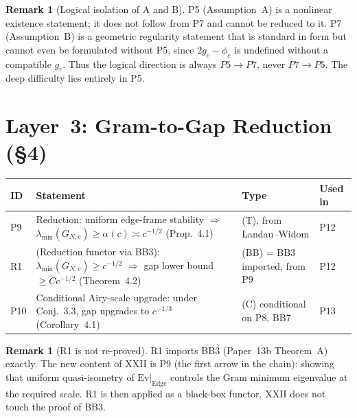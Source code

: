 \documentclass[12pt,a4paper]{amsart}
\theoremstyle{definition}
\newtheorem{remark}[theorem]{Remark}
\begin{document}
\begin{remark}[Logical isolation of A and B]
P5 (Assumption~A) is a nonlinear existence statement;
it does not follow from P7 and cannot be reduced to it.
P7 (Assumption~B) is a geometric regularity statement
that is standard in form but cannot even be formulated
without P5, since $2g_c - \phi_c$ is undefined without
a compatible $g_c$.
Thus the logical direction is always $P5 \to P7$, never
$P7 \to P5$.
The deep difficulty lies entirely in P5.
\end{remark}

\section{Layer~3: Gram-to-Gap Reduction (\S4)}
\label{sec:L3}

\begin{center}
\renewcommand{\arraystretch}{1.35}
\begin{tabular}{l p{5.5cm} l l}
\toprule
\textbf{ID} & \textbf{Statement} & \textbf{Type} & \textbf{Used in} \\
\midrule
P9 & Reduction: uniform edge-frame
    stability $\Rightarrow$
    $\lambda_{\min}(G_{N,c})\ge\alpha(c)
    \asymp c^{-1/2}$
    (Prop.~4.1)
    & (T), from Landau--Widom
    & P12 \\
R1 & (Reduction functor via BB3):
    $\lambda_{\min}(G_{N,c})\ge c^{-1/2}$
    $\Rightarrow$ gap lower bound
    $\ge Cc^{-1/2}$ (Theorem~4.2)
    & (BB) = BB3 imported, from P9
    & P12 \\
P10 & Conditional Airy-scale upgrade:
    under Conj.~3.3, gap upgrades
    to $c^{-1/3}$ (Corollary~4.1)
    & (C) conditional on P8, BB7
    & P13 \\
\bottomrule
\end{tabular}
\end{center}

\begin{remark}[R1 is not re-proved]
R1 imports BB3 (Paper~13b Theorem~A) exactly.
The new content of XXII is P9 (the first arrow in the chain):
showing that uniform quasi-isometry of $\mathrm{Ev}|_{\mathrm{Edge}}$
controls the Gram minimum eigenvalue at the required scale.
R1 is then applied as a black-box functor.
XXII does not touch the proof of BB3.
\end{remark}

\end{document}
